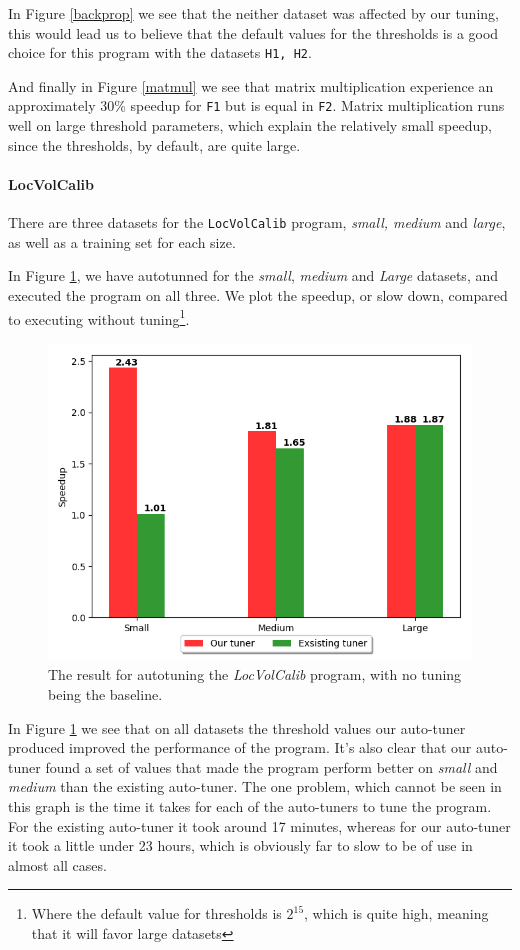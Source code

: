 In Figure \ref{backprop} we see that the neither dataset was affected by our tuning, this would lead us to believe that the default values for the thresholds is a good choice for this program with the datasets \texttt{H1, H2}.

And finally in Figure \ref{matmul} we see that matrix multiplication experience an approximately 30\% speedup for \texttt{F1} but is equal in \texttt{F2}. Matrix multiplication runs well on large threshold parameters, which explain the relatively small speedup, since the thresholds, by default, are quite large.

\paragraph{LocVolCalib}
There are three datasets for the \texttt{LocVolCalib} program, \textit{small,
medium} and \textit{large}, as well as a training set for each size.

In Figure \ref{LocVolCalib-SmallMediumLarge}, we have autotunned for the
\textit{small}, \textit{medium} and \textit{Large} datasets, and executed the program on all
three. We plot the speedup, or slow down, compared to executing without
tuning\footnote{Where the default value for thresholds is $2^{15}$, which is
quite high, meaning that it will favor large datasets}.
\begin{figure}[h]
	\centering
	\includegraphics[width=.7\textwidth]{../benchmarks/LocVolCalib.png}
  \caption{The result for autotuning the \textit{LocVolCalib} program, with no tuning being the baseline.}
	\label{LocVolCalib-SmallMediumLarge}
\end{figure}
In Figure \ref{LocVolCalib-SmallMediumLarge} we see that on all datasets the
threshold values our auto-tuner produced improved the performance of the
program. It's also clear that our auto-tuner found a set of values that made
the program perform better on \textit{small} and \textit{medium} than the
existing auto-tuner. The one problem, which cannot be seen in this graph is the
time it takes for each of the auto-tuners to tune the program. For the existing
auto-tuner it took around 17 minutes, whereas for our auto-tuner it took a
little under 23 hours, which is obviously far to slow to be of use in almost
all cases. 

